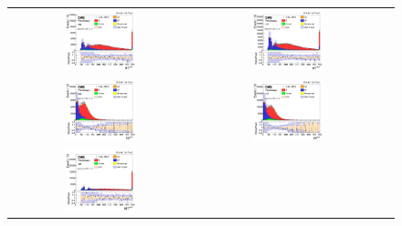 \begin{figure}[ht]
  \begin{center}
    \begin{tabular}{ccc}
      \includegraphics[width=0.4\textwidth]{figures/tW/fig/Step2/ee/H_HT_sys.png}   &
      \includegraphics[width=0.4\textwidth]{figures/tW/fig/Step2/mumu/H_HT_sys.png} \\
      \includegraphics[width=0.4\textwidth]{figures/tW/fig/Step2/ee/H_Pt_sys.png}   &
      \includegraphics[width=0.4\textwidth]{figures/tW/fig/Step2/mumu/H_Pt_sys.png} \\
      \includegraphics[width=0.4\textwidth]{figures/tW/fig/Step2/ee/H_MT_sys.png}    &

\end{tabular}
\end{center}
\end{figure}
